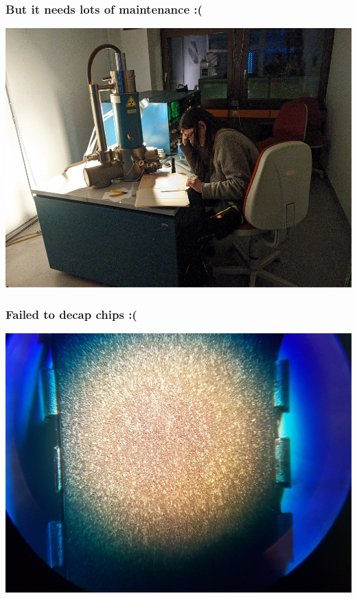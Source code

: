 \documentclass[aspectratio=169]{beamer}
\begin{document}
\begin{frame}
	\frametitle{But it needs lots of maintenance :(}

	\begin{center}
		\includegraphics[height=0.9\textheight]{sem-04.jpg}
	\end{center}
\end{frame}

\begin{frame}
	\frametitle{Failed to decap chips :(}

	\begin{center}
		\includegraphics[height=0.9\textheight]{sem-05.jpg}
	\end{center}
\end{frame}
\end{document}
